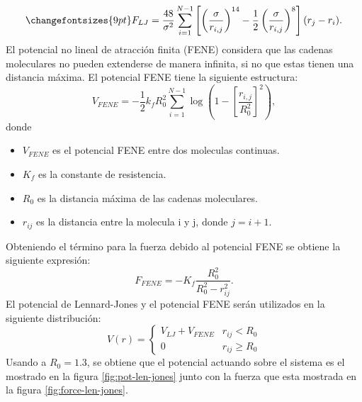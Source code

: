 \begin{equation}
    \changefontsizes{9pt}
    \label{eq:f-n}
    F_{LJ} = \frac{48}{\sigma^2}\sum\limits_{i=1}^{N-1}\left[\left(\frac{\sigma}{r_{i,j}}\right)^{14}-\frac{1}{2}\left(\frac{\sigma}{r_{i,j}} \right)^8  \right] (r_{j}-r_i).
\end{equation}
El potencial no lineal de atracción finita (FENE) considera que las cadenas moleculares no pueden extenderse de manera infinita, si no que estas tienen una distancia máxima. 
El potencial FENE tiene la siguiente estructura:
\begin{equation}
    V_{FENE}= -\frac{1}{2} k_f R_0^2 \sum\limits_{i=1}^{N-1} \log\left(1-\left[\frac{r_{i,j}}{R_0^2}\right]^2 \right),
    \label{eq:potFENE}
\end{equation}
donde
\begin{itemize}
    \item $V_{FENE}$ es el potencial FENE entre dos moleculas continuas.
    \item $K_f$ es la constante de resistencia. 
    \item $R_0$ es la distancia máxima de las cadenas moleculares.
    \item $r_{ij}$ es la distancia entre la molecula i y j, donde $j=i+1$.
\end{itemize}
Obteniendo el término para la fuerza debido al potencial FENE se obtiene la siguiente expresión:
\begin{equation}
    \label{eq:forceFENE}
    F_{FENE}= -K_f \frac{R_0^2}{R_0^2-r_{ij}^2}.
\end{equation}
El potencial de Lennard-Jones y el potencial FENE serán utilizados en la siguiente distribución:
\begin{equation}
    V(r)= \left\lbrace\begin{matrix}
        V_{LJ}+V_{FENE} & r_{ij}<R_0\\
        0 & r_{ij} \geq R_0
    \end{matrix} \right.
\end{equation}
Usando a $R_0=1.3$, se obtiene que el potencial actuando sobre el sistema es el mostrado en la figura \ref{fig:pot-len-jones} junto con la fuerza que esta mostrada en la figura \ref{fig:force-len-jones}.
